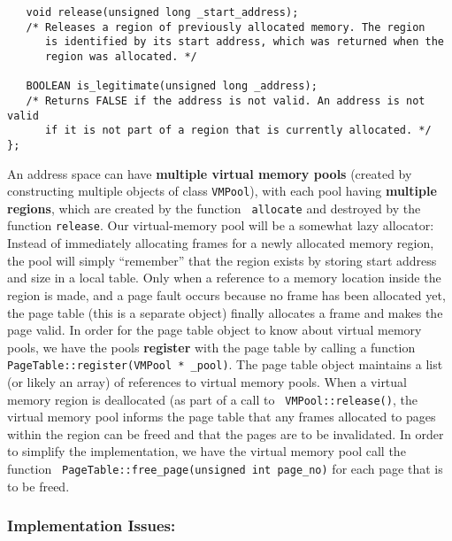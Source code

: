 \documentclass[letterpaper,11pt]{article}
\begin{document}
{\begin{verbatim}
   void release(unsigned long _start_address);
   /* Releases a region of previously allocated memory. The region
      is identified by its start address, which was returned when the
      region was allocated. */

   BOOLEAN is_legitimate(unsigned long _address);
   /* Returns FALSE if the address is not valid. An address is not valid
      if it is not part of a region that is currently allocated. */
};
\end{verbatim}

An address space can have {\bf multiple virtual memory pools} (created by
constructing multiple objects of class {\tt VMPool}), with each pool
having {\bf multiple regions}, which are created by the function {\tt
  allocate} and destroyed by the function {\tt release}. 
Our virtual-memory pool will be a somewhat lazy allocator: Instead of
immediately allocating frames for a newly allocated memory region,
the pool will simply ``remember'' that the region exists by storing
start address and size in a local table. Only when a reference to a
memory location inside the region is made, and a page fault occurs
because no frame has been allocated yet, the page table (this is a
separate object) finally allocates a frame and makes the page valid.
In order for the page table object to know about virtual memory pools,
we have the pools {\bf register} with the page table by calling a
function {\tt PageTable::register(VMPool * \_pool)}. The page table
object maintains a list (or likely an array) of references to virtual
memory pools. 
When a virtual memory region is deallocated (as part of a call to {\tt
  VMPool::release()}, the virtual memory pool informs the page table
that any frames allocated to pages within the region can be freed and that
the pages are to be invalidated. In order to simplify the
implementation, we have the virtual memory pool call the function {\tt
  PageTable::free\_page(unsigned int page\_no)} for each page that is to
be freed.

\subsubsection*{Implementation Issues:}

}
\end{document}
